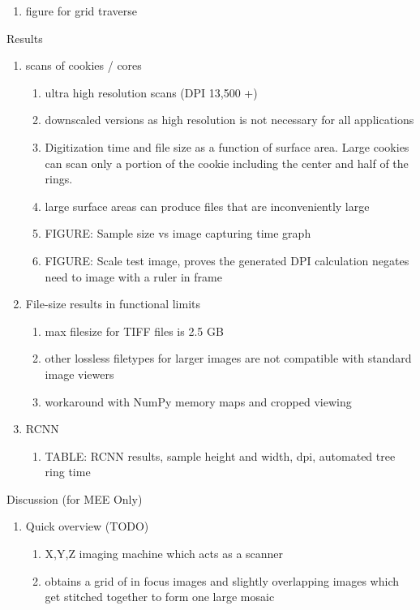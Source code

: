 \documentclass{article}
\begin{document}
\begin{outline}[enumerate]
\begin{enumerate}
\begin{enumerate}
\begin{enumerate}
				\item figure for grid traverse
				\end{enumerate}
			\end{enumerate}
		\end{enumerate}
\item Results
	\begin{enumerate}
	\item scans of cookies / cores
		\begin{enumerate}
		\item ultra high resolution scans (DPI 13,500 +)
		\item downscaled versions as high resolution is not necessary for all applications
		\item Digitization time and file size as a function of surface area. Large cookies can scan only a portion of the cookie including the center and half of the rings.
		\item large surface areas can produce files that are inconveniently large
		\item FIGURE: Sample size vs image capturing time graph
		\item FIGURE: Scale test image, proves the generated DPI calculation negates need to image with a ruler in frame
		\end{enumerate}
	\item File-size results in functional limits 
		\begin{enumerate}
		\item max filesize for TIFF files is 2.5 GB
		\item other lossless filetypes for larger images are not compatible with standard image viewers
		\item workaround with NumPy memory maps and cropped viewing 
		\end{enumerate}
	\item RCNN
		\begin{enumerate}
		\item TABLE: RCNN results, sample height and width, dpi, automated tree ring time
		\end{enumerate}
	\end{enumerate}
\item Discussion (for MEE Only) 
	\begin{enumerate}
	\item Quick overview (TODO)
		\begin{enumerate}
		\item X,Y,Z imaging machine which acts as a scanner 
		\item obtains a grid of in focus images and slightly overlapping images which get stitched together to form one large mosaic 

\end{enumerate}
\end{enumerate}
\end{outline}
\end{document}
